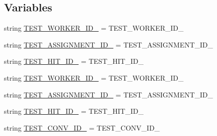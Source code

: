 \subsection*{Variables}
\begin{DoxyCompactItemize}
\item 
string \hyperlink{namespaceparlai_1_1mturk_1_1core_1_1legacy__2018_1_1test_1_1test__socket__manager_aa3bc90f647cf8a46cf4e912e7c8ba644}{T\+E\+S\+T\+\_\+\+W\+O\+R\+K\+E\+R\+\_\+\+I\+D\+\_} = \textquotesingle{}T\+E\+S\+T\+\_\+\+W\+O\+R\+K\+E\+R\+\_\+\+I\+D\+\_\textquotesingle{}
\item 
string \hyperlink{namespaceparlai_1_1mturk_1_1core_1_1legacy__2018_1_1test_1_1test__socket__manager_a58996cb5987f5baded0e4477aadecfc2}{T\+E\+S\+T\+\_\+\+A\+S\+S\+I\+G\+N\+M\+E\+N\+T\+\_\+\+I\+D\+\_} = \textquotesingle{}T\+E\+S\+T\+\_\+\+A\+S\+S\+I\+G\+N\+M\+E\+N\+T\+\_\+\+I\+D\+\_\textquotesingle{}
\item 
string \hyperlink{namespaceparlai_1_1mturk_1_1core_1_1legacy__2018_1_1test_1_1test__socket__manager_a4f82819ec8446586d710533ec31c3e25}{T\+E\+S\+T\+\_\+\+H\+I\+T\+\_\+\+I\+D\+\_} = \textquotesingle{}T\+E\+S\+T\+\_\+\+H\+I\+T\+\_\+\+I\+D\+\_\textquotesingle{}
\item 
string \hyperlink{namespaceparlai_1_1mturk_1_1core_1_1legacy__2018_1_1test_1_1test__socket__manager_a86ff45eeaf03b8a483117af1a7d7e339}{T\+E\+S\+T\+\_\+\+W\+O\+R\+K\+E\+R\+\_\+\+I\+D\+\_} = \textquotesingle{}T\+E\+S\+T\+\_\+\+W\+O\+R\+K\+E\+R\+\_\+\+I\+D\+\_\textquotesingle{}
\item 
string \hyperlink{namespaceparlai_1_1mturk_1_1core_1_1legacy__2018_1_1test_1_1test__socket__manager_a665b3679e3560ac368b4baa4a948d9bd}{T\+E\+S\+T\+\_\+\+A\+S\+S\+I\+G\+N\+M\+E\+N\+T\+\_\+\+I\+D\+\_} = \textquotesingle{}T\+E\+S\+T\+\_\+\+A\+S\+S\+I\+G\+N\+M\+E\+N\+T\+\_\+\+I\+D\+\_\textquotesingle{}
\item 
string \hyperlink{namespaceparlai_1_1mturk_1_1core_1_1legacy__2018_1_1test_1_1test__socket__manager_ac25a848a5db6b2c12800ec020f941876}{T\+E\+S\+T\+\_\+\+H\+I\+T\+\_\+\+I\+D\+\_} = \textquotesingle{}T\+E\+S\+T\+\_\+\+H\+I\+T\+\_\+\+I\+D\+\_\textquotesingle{}
\item 
string \hyperlink{namespaceparlai_1_1mturk_1_1core_1_1legacy__2018_1_1test_1_1test__socket__manager_a60c159c8e58f240b17bea28eabf911a9}{T\+E\+S\+T\+\_\+\+C\+O\+N\+V\+\_\+\+I\+D\+\_} = \textquotesingle{}T\+E\+S\+T\+\_\+\+C\+O\+N\+V\+\_\+\+I\+D\+\_\textquotesingle{}
\item 

\end{DoxyCompactItemize}
